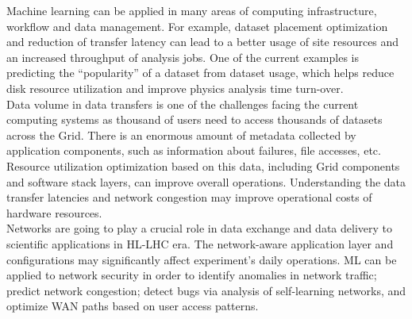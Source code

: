 Machine learning can be applied in many areas of computing infrastructure, workflow and data management. For example, dataset placement optimization and reduction of transfer latency can lead to a better usage of site resources and an increased throughput of analysis jobs. One of the current examples is predicting the ``popularity'' of a dataset from dataset usage, which helps reduce disk resource utilization and improve physics analysis time turn-over.\\

Data volume in data transfers is one of the challenges facing the current computing systems as thousand of users need to access thousands of datasets across the Grid. There is an enormous amount of metadata collected by application components, such as information about failures, file accesses, etc. Resource utilization optimization based on this data, including Grid components and software stack layers, can improve overall operations. Understanding the data transfer latencies and network congestion may improve operational costs of hardware resources.\\

Networks are going to play a crucial role in data exchange and data delivery to scientific applications in HL-LHC era. The network-aware application layer and configurations may significantly affect experiment's daily operations. ML can be applied to network security in order to identify anomalies in network traffic; predict network congestion; detect bugs via analysis of self-learning networks, and optimize WAN paths based on user access patterns.\\




